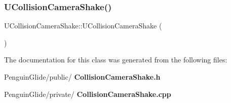 \subsubsection{UCollisionCameraShake()}
{\footnotesize\ttfamily U\+Collision\+Camera\+Shake\+::\+U\+Collision\+Camera\+Shake (\begin{DoxyParamCaption}{ }\end{DoxyParamCaption})}



The documentation for this class was generated from the following files\+:\begin{DoxyCompactItemize}
\item 
Penguin\+Glide/public/\textbf{ Collision\+Camera\+Shake.\+h}\item 
Penguin\+Glide/private/\textbf{ Collision\+Camera\+Shake.\+cpp}\end{DoxyCompactItemize}
